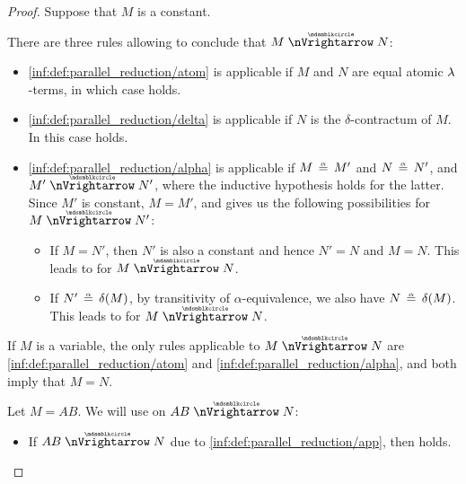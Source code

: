 \begin{proof}
   Suppose that \( M \) is a constant.

  There are three rules allowing to conclude that \( M \ppred N \):
  \begin{itemize}
    \item \ref{inf:def:parallel_reduction/atom} is applicable if \( M \) and \( N \) are equal atomic \( {\mathrm \lambda} \)-terms, in which case  holds.

    \item \ref{inf:def:parallel_reduction/delta} is applicable if \( N \) is the \( \delta \)-contractum of \( M \). In this case  holds.

    \item \ref{inf:def:parallel_reduction/alpha} is applicable if \( M \aequiv M' \) and \( N \aequiv N' \), and \( M' \ppred N' \), where the inductive hypothesis holds for the latter. Since \( M' \) is constant, \( M = M' \), and  gives us the following possibilities for \( M \ppred N' \):

    \begin{itemize}
      \item If \( M = N' \), then \( N' \) is also a constant and hence \( N' = N \) and \( M = N \). This leads to  for \( M \ppred N \).

      \item If \( N' \aequiv \op*{\delta}(M) \), by transitivity of \( \alpha \)-equivalence, we also have \( N \aequiv \op*{\delta}(M) \). This leads to  for \( M \ppred N \).
    \end{itemize}
  \end{itemize}

   If \( M \) is a variable, the only rules applicable to \( M \ppred N \) are \ref{inf:def:parallel_reduction/atom} and \ref{inf:def:parallel_reduction/alpha}, and both imply that \( M = N \).

   Let \( M = AB \). We will use  on \( AB \ppred N \):
  \begin{itemize}
    \item If \( AB \ppred N \) due to \ref{inf:def:parallel_reduction/app}, then  holds.


\end{itemize}
\end{proof}
